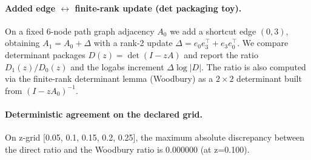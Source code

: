 \paragraph{Added edge $\leftrightarrow$ finite-rank update (det packaging toy).} \AuditTag On a fixed 6-node path graph adjacency $A_0$ we add a shortcut edge $(0,3)$, obtaining $A_1=A_0+\Delta$ with a rank-2 update $\Delta=e_0e_3^\top+e_3e_0^\top$. We compare determinant packages $D(z)=\det(I-zA)$ and report the ratio $D_1(z)/D_0(z)$ and the logabs increment $\Delta\log|D|$. The ratio is also computed via the finite-rank determinant lemma (Woodbury) as a $2\times2$ determinant built from $(I-zA_0)^{-1}$.
\paragraph{Deterministic agreement on the declared grid.} \AuditTag On z-grid [0.05, 0.1, 0.15, 0.2, 0.25], the maximum absolute discrepancy between the direct ratio and the Woodbury ratio is 0.000000 (at z=0.100).